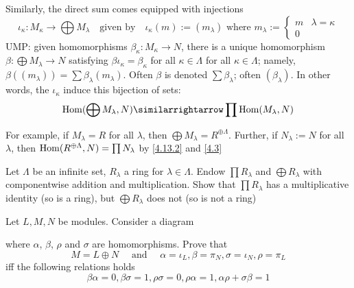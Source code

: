 \documentclass[11pt]{article}
\begin{document}
Similarly, the direct sum comes equipped with injections
\begin{equation*}
\iota_\kappa:M_\kappa\to\bigoplus M_\lambda\quad\text{given by}\quad
\iota_\kappa(m):=(m_\lambda)\text{ where }m_\lambda:=
\begin{cases}
m&\lambda=\kappa\\
0
\end{cases}
\end{equation*}
UMP: given homomorphisms \(\beta_\kappa:M_\kappa\to N\), there is a unique
homomorphism
\(\beta:\bigoplus M_\lambda\to N\) satisfying
\(\beta\iota_\kappa=\beta_\kappa\) for all \(\kappa\in\Lambda\) for all
\(\kappa\in\Lambda\); namely,
\(\beta((m_\lambda))=\sum\beta_\lambda(m_\lambda)\). Often \(\beta\) is denoted
\(\sum\beta_\lambda\); often \((\beta_\lambda)\). In other words, the
\(\iota_\kappa\) induce this bijection of sets:
\begin{equation}
\Hom(\bigoplus M_\lambda,N)\similarrightarrow\prod\Hom(M_\lambda,N)
\label{4.13.2}
\end{equation}

For example, if \(M_\lambda=R\) for all \(\lambda\), then \(\bigoplus
   M_\lambda=R^{\oplus\Lambda}\). Further, if \(N_\lambda:=N\) for all \(\lambda\), then
\(\operatorname{Hom}(R^{\oplus\Lambda},N)=\prod N_\lambda\) by \eqref{4.13.2} and \ref{4.3}

\begin{exercise}
\label{4.14}
Let \(\Lambda\) be an infinite set, \(R_\lambda\) a ring for \(\lambda\in\Lambda\).
Endow \(\prod R_\lambda\) and \(\bigoplus R_\lambda\) with componentwise
addition and multiplication. Show that \(\prod R_\lambda\) has a
multiplicative identity (so is a ring), but \(\bigoplus R_\lambda\) does not
(so is not a ring)
\end{exercise}

\begin{exercise}
\label{4.15}
Let \(L,M,N\) be modules. Consider a diagram
\begin{center}
\end{center}
where \(\alpha\), \(\beta\), \(\rho\) and \(\sigma\) are homomorphisms. Prove that
\begin{equation*}
M=L\oplus N \quad\text{ and }\quad\alpha=\iota_L,\beta=\pi_N,\sigma=\iota_N,\rho=\pi_L
\end{equation*}
iff the following relations holds
\begin{equation*}
\beta\alpha=0,\beta\sigma=1,\rho\sigma=0,\rho\alpha=1,\alpha\rho+\sigma\beta=1
\end{equation*}
\end{exercise}
\end{document}
